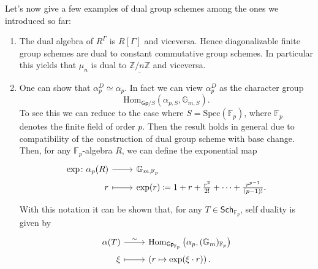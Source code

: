 \noindent
Let's now give a few examples of dual group schemes among the ones we introduced so far:
\begin{ex}[]\leavevmode\vspace{-.2\baselineskip}\label{ex:GroupSchemeDuality}
\begin{enumerate}
	\item The dual algebra of $R^\Gamma$ is $R[\Gamma]$ and viceversa.
		Hence diagonalizable finite group schemes are dual to constant commutative group schemes.
		In particular this yields that $\mu_n$ is dual to $\underline{\mathbb{Z}/n\mathbb{Z}}$
		and viceversa.

	\item One can show that $\alpha_p^D \simeq \alpha_p$.
		In fact we can view $\alpha_p^D$ as the character group
		\begin{equation*}
			\mathrm{Hom}_{\mathsf{Gp}/S} \left( \alpha_{p,S}, \mathbb{G}_{m,S} \right)
		.\end{equation*}
		To see this we can reduce to the case where 
		$S = \mathrm{Spec}(\mathbb{F}_p)$, where
		$\mathbb{F}_{p}$ denotes the finite field of order $p$. Then
		the result holds in general due to compatibility of the construction of
		dual group scheme with base change.
		Then, for any $\mathbb{F}_{p}$-algebra $R$, we can define the exponential map
		\begin{equation*}
		\begin{tikzcd}[row sep = 0ex
			,/tikz/column 1/.append style={anchor=base east}
			,/tikz/column 2/.append style={anchor=base west}]
			\mathrm{exp}\colon \alpha_p(R) \arrow[r, "", rightarrow] &
			\mathbb{G}_{m,\mathbb{F}_{p}} \\
			r \arrow[r, "", mapsto] & \mathrm{exp}(r) \coloneqq
			1 + r + \frac{r^2}{2!} + \cdots + \frac{r^{p-1}}{\left( p-1 \right)!}
		.\end{tikzcd}
		\end{equation*} 
		With this notation it can be shown that, for any
		$T \in \mathsf{Sch}_{ \mathbb{F}_{p} }$, self duality is given by
		\begin{equation*}
		\begin{tikzcd}[row sep = 0ex
			,/tikz/column 1/.append style={anchor=base east}
			,/tikz/column 2/.append style={anchor=base west}]
			\alpha(T) \arrow[r, "\sim", rightarrow] &
			\mathrm{Hom}_{\mathsf{Gp}_{ \mathbb{F}_{p} }}
			\left( \alpha_p, (\mathbb{G}_m)_{\mathbb{F}_{p}} \right) \\
			\xi \arrow[r, "", mapsto] & 
			\left( r \mapsto \mathrm{exp}(\xi \cdot r) \right)
		.\end{tikzcd}
		\end{equation*} 
\end{enumerate}
\end{ex}



